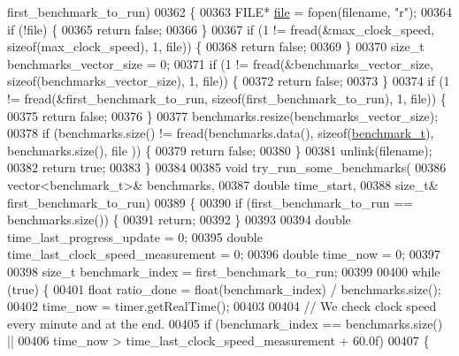 \begin{DoxyCode}
      first\_benchmark\_to\_run)
00362 \{
00363   FILE* \hyperlink{structfile}{file} = fopen(filename, \textcolor{stringliteral}{"r"});
00364   \textcolor{keywordflow}{if} (!file) \{
00365     \textcolor{keywordflow}{return} \textcolor{keyword}{false};
00366   \}
00367   \textcolor{keywordflow}{if} (1 != fread(&max\_clock\_speed, \textcolor{keyword}{sizeof}(max\_clock\_speed), 1, file)) \{
00368     \textcolor{keywordflow}{return} \textcolor{keyword}{false};
00369   \}
00370   \textcolor{keywordtype}{size\_t} benchmarks\_vector\_size = 0;
00371   \textcolor{keywordflow}{if} (1 != fread(&benchmarks\_vector\_size, \textcolor{keyword}{sizeof}(benchmarks\_vector\_size), 1, file)) \{
00372     \textcolor{keywordflow}{return} \textcolor{keyword}{false};
00373   \}
00374   \textcolor{keywordflow}{if} (1 != fread(&first\_benchmark\_to\_run, \textcolor{keyword}{sizeof}(first\_benchmark\_to\_run), 1, file)) \{
00375     \textcolor{keywordflow}{return} \textcolor{keyword}{false};
00376   \}
00377   benchmarks.resize(benchmarks\_vector\_size);
00378   \textcolor{keywordflow}{if} (benchmarks.size() != fread(benchmarks.data(), \textcolor{keyword}{sizeof}(\hyperlink{structbenchmark__t}{benchmark\_t}), benchmarks.size(), file
      )) \{
00379     \textcolor{keywordflow}{return} \textcolor{keyword}{false};
00380   \}
00381   unlink(filename);
00382   \textcolor{keywordflow}{return} \textcolor{keyword}{true};
00383 \}
00384 
00385 \textcolor{keywordtype}{void} try\_run\_some\_benchmarks(
00386   vector<benchmark\_t>& benchmarks,
00387   \textcolor{keywordtype}{double} time\_start,
00388   \textcolor{keywordtype}{size\_t}& first\_benchmark\_to\_run)
00389 \{
00390   \textcolor{keywordflow}{if} (first\_benchmark\_to\_run == benchmarks.size()) \{
00391     \textcolor{keywordflow}{return};
00392   \}
00393 
00394   \textcolor{keywordtype}{double} time\_last\_progress\_update = 0;
00395   \textcolor{keywordtype}{double} time\_last\_clock\_speed\_measurement = 0;
00396   \textcolor{keywordtype}{double} time\_now = 0;
00397 
00398   \textcolor{keywordtype}{size\_t} benchmark\_index = first\_benchmark\_to\_run;
00399 
00400   \textcolor{keywordflow}{while} (\textcolor{keyword}{true}) \{
00401     \textcolor{keywordtype}{float} ratio\_done = float(benchmark\_index) / benchmarks.size();
00402     time\_now = timer.getRealTime();
00403 
00404     \textcolor{comment}{// We check clock speed every minute and at the end.}
00405     \textcolor{keywordflow}{if} (benchmark\_index == benchmarks.size() ||
00406         time\_now > time\_last\_clock\_speed\_measurement + 60.0f)
00407     \{

\end{DoxyCode}
